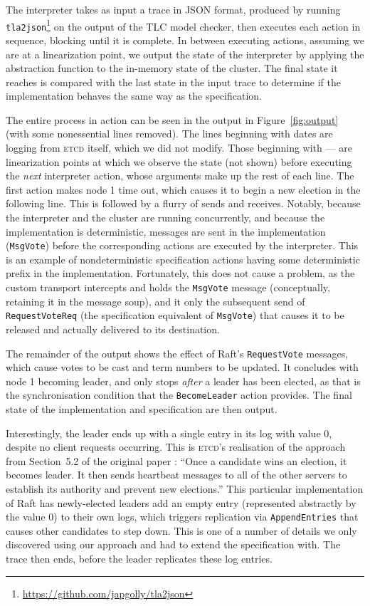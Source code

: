 \documentclass[a4paper]{article}
\newcommand{\tname}[1]{\textsc{#1}\xspace}
\newcommand{\etcd}{\tname{etcd}}
\begin{document}
The interpreter takes as input a trace in JSON format, produced by running \texttt{tla2json}\footnote{\url{https://github.com/japgolly/tla2json}} on the output of the TLC model checker, then executes each action in sequence, blocking until it is complete.
%
In between executing actions, assuming we are at a linearization point, we output the state of the interpreter by applying the abstraction function to the in-memory state of the cluster.
%
The final state it reaches is compared with the last state in the input trace to determine if the implementation behaves the same way as the specification.

The entire process in action can be seen in the output in Figure~\ref{fig:output} (with some nonessential lines removed).
%
The lines beginning with dates are logging from \etcd itself, which we did not modify.
%
Those beginning with --- are linearization points at which we observe the state (not shown) before executing the \emph{next} interpreter action, whose arguments make up the rest of each line.
%
The first action makes node 1 time out, which causes it to begin a new election in the following line.
%
This is followed by a flurry of sends and receives.
%
Notably, because the interpreter and the cluster are running concurrently, and because the implementation is deterministic, messages are sent in the implementation (\texttt{MsgVote}) before the corresponding actions are executed by the interpreter.
%
This is an example of nondeterministic specification actions having some deterministic prefix in the implementation.
%
Fortunately, this does not cause a problem, as the custom transport intercepts and holds the \texttt{MsgVote} message (conceptually, retaining it in the message soup), and it only the subsequent send of \texttt{RequestVoteReq} (the specification equivalent of \texttt{MsgVote}) that causes it to be released and actually delivered to its destination.

The remainder of the output shows the effect of Raft's \texttt{RequestVote} messages, which cause votes to be cast and term numbers to be updated.
%
It concludes with node 1 becoming leader, and only stops \emph{after} a leader has been elected, as that is the synchronisation condition that the \texttt{BecomeLeader} action provides.
%
The final state of the implementation and specification are then output.

Interestingly, the leader ends up with a single entry in its log with value 0, despite no client requests occurring.
%
This is \etcd's realisation of the approach from Section~5.2 of the original paper \cite{ongaro_search_2014}: ``Once a candidate wins an election, it becomes leader.
%
It then sends heartbeat messages to all of the other servers to establish its authority and prevent new elections.'' This particular implementation of Raft has newly-elected leaders add an empty entry (represented abstractly by the value 0) to their own logs, which triggers replication via \texttt{AppendEntries} that causes other candidates to step down.
%
This is one of a number of details we only discovered using our approach and had to extend the specification with.
%
The trace then ends, before the leader replicates these log entries.
\end{document}
